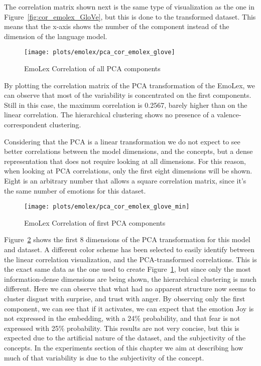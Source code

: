 The correlation matrix shown next is the same type of visualization as the one in Figure~\ref{fig:cor_emolex_GloVe}, but this is done to the transformed dataset. This means that the x-axis shows the number of the component instead of the dimension of the language model.

\begin{figure}[H]
  \texttt{[image: plots/emolex/pca\_cor\_emolex\_glove]}
  \centering
  \caption{EmoLex Correlation of all PCA components}\label{fig:pca_cor_emolex_glove}
\end{figure}

By plotting the correlation matrix of the PCA transformation of the EmoLex, we can observe that most of the variability is concentrated on the first components. Still in this case, the maximum correlation is 0.2567, barely higher than on the linear correlation. The hierarchical clustering shows no presence of a valence-correspondent clustering.

Considering that the PCA is a linear transformation we do not expect to see better correlations between the model dimensions, and the concepts, but a dense representation that does not require looking at all dimensions. For this reason, when looking at PCA correlations, only the first eight dimensions will be shown. Eight is an arbitrary number that allows a square correlation matrix, since it's the same number of emotions for this dataset.

\begin{figure}[H]
  \texttt{[image: plots/emolex/pca\_cor\_emolex\_glove\_min]}
  \centering
  \caption{EmoLex Correlation of first PCA components}\label{fig:pca_cor_emolex_glove_min}
\end{figure}

Figure~\ref{fig:pca_cor_emolex_glove_min} shows the first 8 dimensions of the PCA transformation for this model and dataset. A different color scheme has been selected to easily identify between the linear correlation visualization, and the PCA-transformed correlations. This is the exact same data as the one used to create Figure~\ref{fig:pca_cor_emolex_glove}, but since only the most information-dense dimensions are being shown, the hierarchical clustering is much different. Here we can observe that what had no apparent structure now seems to cluster disgust with surprise, and trust with anger. By observing only the first component, we can see that if it activates, we can expect that the emotion Joy is not expressed in the embedding, with a 24\% probability, and that fear is not expressed with 25\% probability. This results are not very concise, but this is expected due to the artificial nature of the dataset, and the subjectivity of the concepts. In the experiments section of this chapter we aim at describing how much of that variability is due to the subjectivity of the concept.

